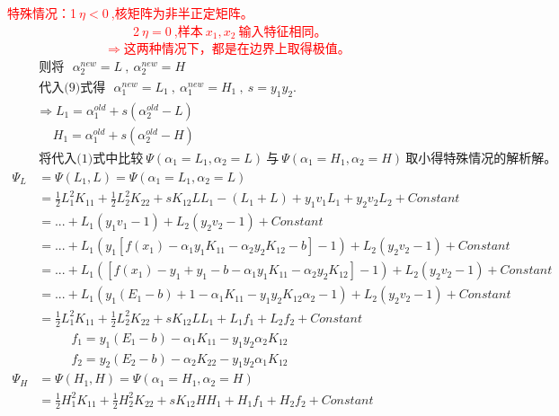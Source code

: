 \textcolor{red}{特殊情况：\textcircled{\footnotesize{1}}$~\eta<0~$,核矩阵为非半正定矩阵。\\
\indent~~~~~~~~~~~~~~~~~~~~\textcircled{\footnotesize{2}}$~\eta=0~$,样本$~x_1,x_2~$输入特征相同。\\
\indent~~~~~~~~~~~~~~~$~\Rightarrow$这两种情况下，都是在边界上取得极值。}
\begin{align}
  &~~~~~~\text{则将}~~~\alpha_2^{new}=L~,~\alpha_2^{new}=H \nonumber \\
  &~~~~~~\text{代入(9)式得}~~~\alpha_1^{new}=L_1~,~\alpha_1^{new}=H_1~,~s=y_1y_2. \nonumber \\
  &~~~~~\Rightarrow L_1=\alpha_1^{old}+s(\alpha_2^{old}-L) \nonumber \\
  &~~~~~~~~~~~H_1=\alpha_1^{old}+s(\alpha_2^{old}-H) \nonumber \\
  &~~~~~~\text{将代入(1)式中比较$~\Psi(\alpha_1=L_1,\alpha_2=L)~$与$~\Psi(\alpha_1=H_1,\alpha_2=H)~$取小得特殊情况的解析解。} \nonumber
\end{align}
\begin{align}
  \Psi_L&=\Psi(L_1,L)=\Psi(\alpha_1=L_1,\alpha_2=L)    \nonumber\\
        &=\frac{1}{2}L_1^2K_{11}+\frac{1}{2}L_2^2K_{22}+sK_{12}LL_1-(L_1+L)+y_1v_1L_1+y_2v_2L_2+Constant \nonumber \\
        &=...+L_1(y_1v_1-1)+L_2(y_2v_2-1)+Constant \nonumber \\
        &=...+L_1(y_1[f(x_1)-\alpha_1y_1K_{11}-\alpha_2y_2K_{12}-b]-1)+L_2(y_2v_2-1)+Constant \nonumber \\
        &=...+L_1([f(x_1)-y_1+y_1-b-\alpha_1y_1K_{11}-\alpha_2y_2K_{12}]-1)+L_2(y_2v_2-1)+Constant \nonumber \\
        &=...+L_1(y_1(E_1-b)+1-\alpha_1K_{11}-y_1y_2K_{12}\alpha_2-1)+L_2(y_2v_2-1)+Constant \nonumber \\
        &=\frac{1}{2}L_1^2K_{11}+\frac{1}{2}L_2^2K_{22}+sK_{12}LL_1+L_1f_1+L_2f_2+Constant \nonumber \\
        &~~~~~~~~~~~~f_1=y_1(E_1-b)-\alpha_1K_{11}-y_1y_2\alpha_2K_{12} \nonumber \\
        &~~~~~~~~~~~~f_2=y_2(E_2-b)-\alpha_2K_{22}-y_1y_2\alpha_1K_{12} \nonumber \\
  \Psi_H&=\Psi(H_1,H)=\Psi(\alpha_1=H_1,\alpha_2=H)    \nonumber\\
        &=\frac{1}{2}H_1^2K_{11}+\frac{1}{2}H_2^2K_{22}+sK_{12}HH_1+H_1f_1+H_2f_2+Constant \nonumber
\end{align}

